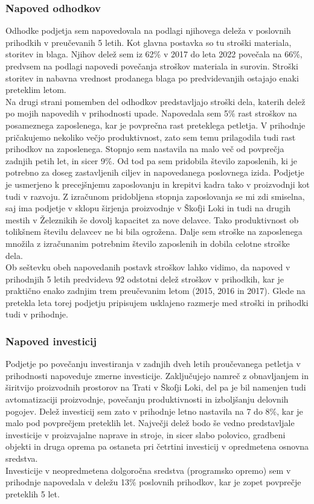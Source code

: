 \documentclass[12pt,a4paper]{amsart}
\theoremstyle{definition} %
\theoremstyle{plain} %
\begin{document}
\subsubsection{Napoved odhodkov}
Odhodke podjetja sem napovedovala na podlagi njihovega deleža v poslovnih prihodkih v preučevanih 5 letih. Kot glavna postavka so tu stroški materiala, storitev in blaga. Njihov delež sem iz 62\% v 2017 do leta 2022 povečala na 66\%, predvsem na podlagi napovedi povečanja stroškov materiala in surovin. Stroški storitev in nabavna vrednost prodanega blaga po predvidevanjih ostajajo enaki preteklim letom.\\
Na drugi strani pomemben del odhodkov predstavljajo stroški dela, katerih delež po mojih napovedih v prihodnosti upade. Napovedala sem 5\% rast stroškov na posameznega zaposlenega, kar je povprečna rast preteklega petletja. V prihodnje pričakujemo nekoliko večjo produktivnost, zato sem temu prilagodila tudi rast prihodkov na zaposlenega. Stopnjo sem nastavila na malo več od povprečja zadnjih petih let, in sicer 9\%. Od tod pa sem pridobila število zaposlenih, ki je potrebno za doseg zastavljenih ciljev in napovedanega poslovnega izida. Podjetje je usmerjeno k precejšnjemu zaposlovanju in krepitvi kadra tako v proizvodnji kot tudi v razvoju. Z izračunom pridobljena stopnja zaposlovanja se mi zdi smiselna, saj ima podjetje v sklopu širjenja proizvodnje v Škofji Loki in tudi na drugih mestih v Železnikih še dovolj kapacitet za nove delavce. Tako produktivnost ob tolikšnem številu delavcev ne bi bila ogrožena. Dalje sem stroške na zaposlenega množila z izračunanim potrebnim število zaposlenih in dobila celotne stroške dela.  \\
Ob seštevku obeh napovedanih postavk stroškov lahko vidimo, da napoved v prihodnjih 5 letih predvideva 92 odstotni delež stroškov v prihodkih, kar je praktično enako zadnjim trem preučevanim letom (2015, 2016 in 2017). Glede na pretekla leta torej podjetju pripisujem usklajeno razmerje med stroški in prihodki tudi v prihodnje.


\subsubsection{Napoved investicij}
Podjetje po povečanju investiranja v zadnjih dveh letih proučevanega petletja v prihodnosti napoveduje zmerne investicije. Zaključujejo namreč z obnavljanjem in širitvijo proizvodnih prostorov na Trati v Škofji Loki, del pa je bil namenjen tudi avtomatizaciji proizvodnje, povečanju produktivnosti in izboljšanju delovnih pogojev. Delež investicij sem zato v prihodnje letno nastavila na 7 do 8\%, kar je malo pod povprečjem preteklih let. Največji delež bodo še vedno predstavljale investicije v proizvajalne naprave in stroje, in sicer slabo polovico, gradbeni objekti in druga oprema pa ostaneta pri četrtini investicij v opredmetena osnovna sredstva.\\
Investicije v neopredmetena dolgoročna sredstva (programsko opremo) sem v prihodnje napovedala v deležu 13\% poslovnih prihodkov, kar je zopet povprečje preteklih 5 let.
\end{document}

